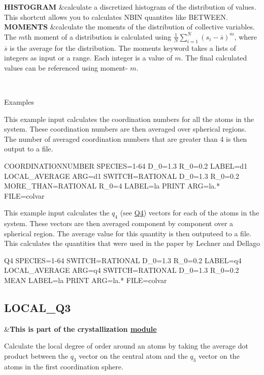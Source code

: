 \begin{TabularC}{2}
{\bfseries  H\+I\+S\+T\+O\+G\+R\+A\+M } &calculate a discretized histogram of the distribution of values. This shortcut allows you to calculates N\+B\+I\+N quantites like B\+E\+T\+W\+E\+E\+N.   \\
{\bfseries  M\+O\+M\+E\+N\+T\+S } &calculate the moments of the distribution of collective variables. The $m$th moment of a distribution is calculated using $\frac{1}{N} \sum_{i=1}^N ( s_i - \overline{s} )^m $, where $\overline{s}$ is the average for the distribution. The moments keyword takes a lists of integers as input or a range. Each integer is a value of $m$. The final calculated values can be referenced using moment-\/ $m$.  

\\
\end{TabularC}


\begin{DoxyParagraph}{Examples}

\end{DoxyParagraph}
This example input calculates the coordination numbers for all the atoms in the system. These coordination numbers are then averaged over spherical regions. The number of averaged coordination numbers that are greater than 4 is then output to a file.

\begin{DoxyVerb}COORDINATIONNUMBER SPECIES=1-64 D_0=1.3 R_0=0.2 LABEL=d1
LOCAL_AVERAGE ARG=d1 SWITCH={RATIONAL D_0=1.3 R_0=0.2} MORE_THAN={RATIONAL R_0=4} LABEL=la
PRINT ARG=la.* FILE=colvar 
\end{DoxyVerb}


This example input calculates the $q_4$ (see \hyperlink{Q4}{Q4}) vectors for each of the atoms in the system. These vectors are then averaged component by component over a spherical region. The average value for this quantity is then outputeed to a file. This calculates the quantities that were used in the paper by Lechner and Dellago \cite{dellago-q6}

\begin{DoxyVerb}Q4 SPECIES=1-64 SWITCH={RATIONAL D_0=1.3 R_0=0.2} LABEL=q4
LOCAL_AVERAGE ARG=q4 SWITCH={RATIONAL D_0=1.3 R_0=0.2} MEAN LABEL=la
PRINT ARG=la.* FILE=colvar
\end{DoxyVerb}
 \hypertarget{LOCAL_Q3}{}\subsection{L\+O\+C\+A\+L\+\_\+\+Q3}\label{LOCAL_Q3}
\begin{TabularC}{2}
\hline
&{\bfseries  This is part of the crystallization \hyperlink{mymodules}{module }}   \\
\end{TabularC}
Calculate the local degree of order around an atoms by taking the average dot product between the $q_3$ vector on the central atom and the $q_3$ vector on the atoms in the first coordination sphere.

